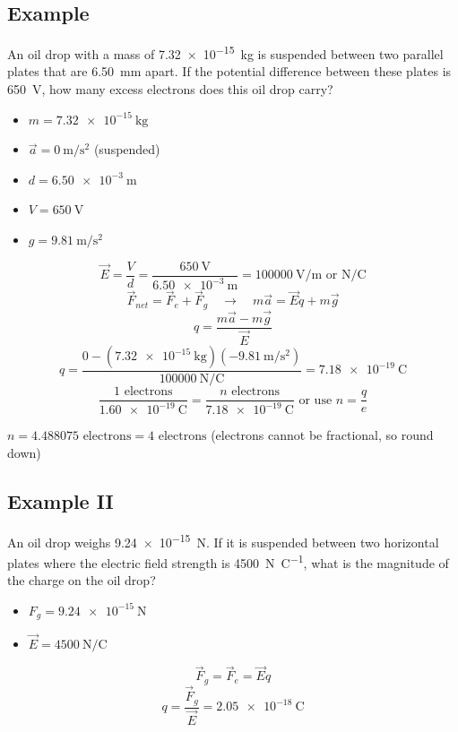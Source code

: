 \documentclass[a4paper,12pt]{article}
\begin{document}
\subsection{Example}
An oil drop with a mass of \SI{7.32e-15}{\kg} is suspended between two parallel plates that are \SI{6.50}{\milli\m} apart. If the potential difference between these plates is \SI{650}{\volt}, how many excess electrons does this oil drop carry?
\begin{itemize}
    \item{$m = \SI{7.32e-15}{\kg}$}
    \item{$\vec{a} = \SI{0}{\m\per\s\squared}$ (suspended)}
    \item{$d = \SI{6.50e-3}{\m}$}
    \item{$V = \SI{650}{\volt}$}
    \item{$g = \SI{9.81}{\m\per\s\squared}$}
\end{itemize}
$$\vec{E} = \frac{V}{d} = \frac{\SI{650}{\volt}}{\SI{6.50e-3}{\m}} = \SI{100000}{\volt\per\m} \textrm{ or } \si{\newton\per\coulomb}$$
$$\vec{F}_{net} = \vec{F}_e + \vec{F}_g \quad\longrightarrow\quad m\vec{a} = \vec{E}q + m\vec{g}$$
$$q = \frac{m\vec{a} - m\vec{g}}{\vec{E}}$$
$$q = \frac{0 - (\SI{7.32e-15}{\kg})(\SI{-9.81}{\m\per\s\squared})}{\SI{100000}{\newton\per\coulomb}} = \SI{7.18e-19}{\coulomb}$$
$$\frac{\num{1}\textrm{ electrons}}{\SI{1.60e-19}{\coulomb}} = \frac{n\textrm{ electrons}}{\SI{7.18e-19}{\coulomb}} \textrm{ or use } n = \frac{q}{e}$$

$n = \num{4.488075}\textrm{ electrons} = \num{4}\textrm{ electrons}$ (electrons cannot be fractional, so round down)

\subsection{Example II}
An oil drop weighs \SI{9.24e-15}{\newton}. If it is suspended between two horizontal plates where the electric field strength is \SI{4500}{\newton\per\coulomb}, what is the magnitude of the charge on the oil drop?
\begin{itemize}
    \item{$F_g = \SI{9.24e-15}{\newton}$}
    \item{$\vec{E} = \SI{4500}{\newton\per\coulomb}$}
\end{itemize}
$$\vec{F}_g = \vec{F}_e = \vec{E}q$$
$$q = \frac{\vec{F}_g}{\vec{E}} = \SI{2.05e-18}{\coulomb}$$

\pagebreak
\end{document}
